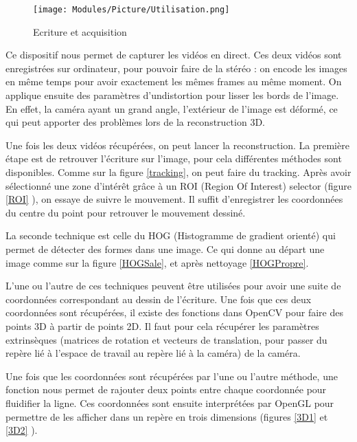 
\begin{figure}[!h]
\centering
\texttt{[image: Modules/Picture/Utilisation.png]}
\caption{Ecriture et acquisition}
\label{utilisation}
\end{figure}

Ce dispositif nous permet de capturer les vidéos en direct. Ces deux vidéos sont enregistrées sur ordinateur, pour pouvoir faire de la stéréo : on encode les images en même temps pour avoir exactement les mêmes frames au même moment. On applique ensuite des paramètres d'undistortion pour lisser les bords de l'image. En effet, la caméra ayant un grand angle, l'extérieur de l'image est déformé, ce qui peut apporter des problèmes lors de la reconstruction 3D.

Une fois les deux vidéos récupérées, on peut lancer la reconstruction. La première étape est de retrouver l'écriture sur l'image, pour cela différentes méthodes sont disponibles. Comme sur la figure \ref{tracking}, on peut faire du tracking. Après avoir sélectionné une zone d'intérêt grâce à un ROI (Region Of Interest) selector (figure \ref{ROI} ), on essaye de suivre le mouvement. Il suffit d'enregistrer les coordonnées du centre du point pour retrouver le mouvement dessiné.

La seconde technique est celle du HOG (Histogramme de gradient orienté) qui permet de détecter des formes dans une image. Ce qui donne au départ une image comme sur la figure \ref{HOGSale}, et après nettoyage \ref{HOGPropre}.

L'une ou l'autre de ces techniques peuvent être utilisées pour avoir une suite de coordonnées correspondant au dessin de l'écriture. Une fois que ces deux coordonnées sont récupérées, il existe des fonctions dans OpenCV pour faire des points 3D à partir de points 2D. Il faut pour cela récupérer les paramètres extrinsèques (matrices de rotation et vecteurs de translation, pour passer du repère lié à l'espace de travail au repère lié à la caméra) de la caméra.

Une fois que les coordonnées sont récupérées par l'une ou l'autre méthode, une fonction nous permet de rajouter deux points entre chaque coordonnée pour fluidifier la ligne. Ces coordonnées sont ensuite interprétées par OpenGL pour permettre de les afficher dans un repère en trois dimensions (figures \ref{3D1} et \ref{3D2} ).


